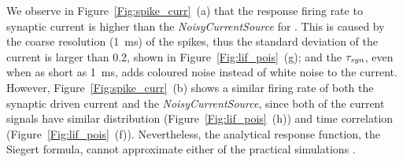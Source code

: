	We observe in Figure~\ref{Fig:spike_curr}~(a) that the response firing rate to synaptic current is higher than the \textit{NoisyCurrentSource} for \DIFdelbegin {}\DIFdelend \DIFaddbegin {}\DIFaddend .
	This is caused by the coarse resolution (1~ms) of the spikes, thus the standard deviation of the current is larger than 0.2, shown in Figure~\ref{Fig:lif_pois}~(g);
	and the $\tau_{\textit{\textrm{syn}}}$, even when as short as 1~ms, adds coloured noise instead of white noise to the current.
	However, Figure~\ref{Fig:spike_curr}~(b) shows a similar firing rate of both the synaptic driven current and the \textit{NoisyCurrentSource}, since both of the current signals have similar distribution (Figure~\ref{Fig:lif_pois}~(h)) and time correlation (Figure~\ref{Fig:lif_pois}~(f)).
	Nevertheless, the analytical response function, the Siegert formula, cannot approximate either of the practical simulations \DIFaddbegin {}\DIFaddend .

